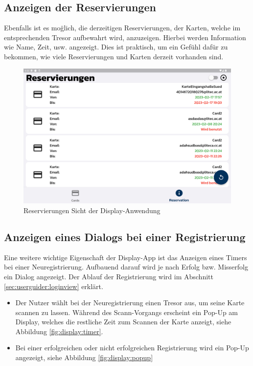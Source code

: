 {\subsection{Anzeigen der Reservierungen}
Ebenfalls ist es mo\"glich, die derzeitigen Reservierungen, der Karten, welche im entsprechenden Tresor aufbewahrt wird, anzuzeigen. Hierbei werden Information wie Name, Zeit, usw. angezeigt. Dies ist praktisch, um ein Gefühl dafür zu bekommen, wie viele Reservierungen und Karten derzeit vorhanden sind.
\begin{figure}[!h]
\includegraphics[width=1.0\textwidth]{FLUTTER/images/GP/Display_Reservation.png}
\caption{Reservierungen Sicht der Display-Anwendung}
\end{figure} %
\subsection{Anzeigen eines Dialogs bei einer Registrierung}
Eine weitere wichtige Eigenschaft der Display-App ist das Anzeigen eines Timers bei einer Neuregistrierung. Aufbauend darauf wird je nach Erfolg bzw. Misserfolg ein Dialog angezeigt.
Der Ablauf der Registrierung wird im Abschnitt \ref{sec:userguider:loginview} erklärt. 
\begin{itemize}
    \item Der Nutzer wählt bei der Neuregistrierung einen Tresor aus, um seine Karte scannen zu lassen. Während des Scann-Vorgangs erscheint ein Pop-Up am Display, welches die restliche Zeit zum Scannen der Karte anzeigt, siehe Abbildung \ref{fig:display:timer}.
    \item Bei einer erfolgreichen oder nicht erfolgreichen Registrierung wird ein Pop-Up angezeigt, siehe Abbildung \ref{fig:display:popup}
\end{itemize}
}
